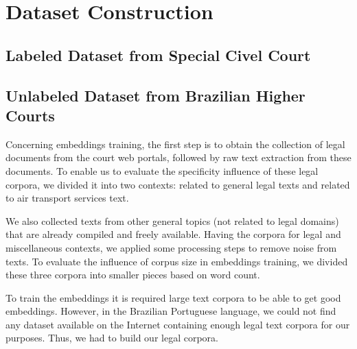 
\section{Dataset Construction} \label{sec:dataset_construction}

\subsection{Labeled Dataset from Special Civel Court}




\subsection{Unlabeled Dataset from Brazilian Higher Courts}

Concerning embeddings training, the first step is to obtain the collection of legal documents from the court web portals, followed by raw text extraction from these documents. To enable us to evaluate the specificity influence of these legal corpora, we divided it into two contexts: related to general legal texts and related to air transport services text.

We also collected texts from other general topics (not related to legal domains) that are already compiled and freely available. Having the corpora for legal and miscellaneous contexts, we applied some processing steps to remove noise from texts. To evaluate the influence of corpus size in embeddings training, we divided these three corpora into smaller pieces based on word count.

To train the embeddings it is required large text corpora to be able to get good embeddings. However, in the Brazilian Portuguese language, we could not find any dataset available on the Internet containing enough legal text corpora for our purposes. Thus, we had to build our legal corpora.

